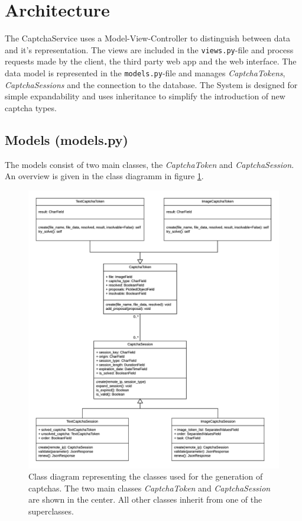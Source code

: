 \section{Architecture}
\label{sec:architecture}

The CaptchaService uses a Model-View-Controller to distinguish between data and it's representation. The views are included in the \verb|views.py|-file and process requests made by the client, the third party web app and the web interface. 
The data model is represented in the \verb|models.py|-file and manages \emph{CaptchaTokens}, \emph{CaptchaSessions} and the connection to the database.
The System is designed for simple expandability and uses inheritance to simplify the introduction of new captcha types. 

\subsection{Models (models.py)}

The models consist of two main classes, the \emph{CaptchaToken} and \emph{CaptchaSession}. An overview is given in the class diagramm in figure \ref{fig:classdia}. 

\begin{figure}[!h]
\centering
\includegraphics[width=1.1\linewidth]{content/figures/classdiagramm.png}
\caption{Class diagram representing the classes used for the generation of captchas. The two main classes \emph{CaptchaToken} and \emph{CaptchaSession} are shown in the center. All other classes inherit from one of the superclasses.
}
\label{fig:classdia}
\end{figure}


